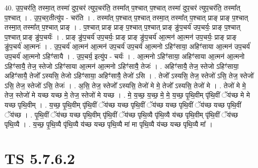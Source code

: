 \documentclass[17pt]{extarticle}
\begin{document}
40. उ॒प॒चर॑ति॒ तस्मा॒त् तस्मा॑ दुप॒चर॑ त्युप॒चर॑ति॒ तस्मा᳚त् प॒श्चात् प॒श्चात् तस्मा॑ दुप॒चर॑ त्युप॒चर॑ति॒ तस्मा᳚त् प॒श्चात् । . उ॒प॒चर॒तीत्यु॑प - चर॑ति । . तस्मा᳚त् प॒श्चात् प॒श्चात् तस्मा॒त् तस्मा᳚त् प॒श्चात् प्राङ् प्राङ् प॒श्चात् तस्मा॒त् तस्मा᳚त् प॒श्चात् प्राङ् । . प॒श्चात् प्राङ् प्राङ् प॒श्चात् प॒श्चात् प्राङ् ङु॑प॒चर्य॑ उप॒चर्यः॒ प्राङ् प॒श्चात् प॒श्चात् प्राङ् ङु॑प॒चर्यः॑ । . प्राङ् ङु॑प॒चर्य॑ उप॒चर्यः॒ प्राङ् प्राङ् ङु॑प॒चर्य॑ आ॒त्मन॑ आ॒त्मन॑ उप॒चर्यः॒ प्राङ् प्राङ्
ङु॑प॒चर्य॑ आ॒त्मनः॑ । . उ॒प॒चर्य॑ आ॒त्मन॑ आ॒त्मन॑ उप॒चर्य॑ उप॒चर्य॑ आ॒त्मनो ऽहिꣳ॑साया॒ अहिꣳ॑साया आ॒त्मन॑ उप॒चर्य॑ उप॒चर्य॑ आ॒त्मनो ऽहिꣳ॑सायै । . उ॒प॒चर्य॒ इत्यु॑प - चर्यः॑ । . आ॒त्मनो ऽहिꣳ॑साया॒ अहिꣳ॑साया आ॒त्मन॑ आ॒त्मनो ऽहिꣳ॑सायै॒ तेज॒ स्तेजो ऽहिꣳ॑साया आ॒त्मन॑ आ॒त्मनो ऽहिꣳ॑सायै॒ तेजः॑ । . अहिꣳ॑सायै॒ तेज॒ स्तेजो ऽहिꣳ॑साया॒ अहिꣳ॑सायै॒ तेजो᳚ ऽस्यसि॒ तेजो ऽहिꣳ॑साया॒ अहिꣳ॑सायै॒ तेजो॑ ऽसि । . तेजो᳚ ऽस्यसि॒ तेज॒ स्तेजो॑ ऽसि॒ तेज॒ स्तेजो॑ ऽसि॒ तेज॒ स्तेजो॑ ऽसि॒ तेजः॑ । . अ॒सि॒ तेज॒ स्तेजो᳚ ऽस्यसि॒ तेजो॑ मे मे॒ तेजो᳚ ऽस्यसि॒ तेजो॑ मे । . तेजो॑ मे मे॒ तेज॒ स्तेजो॑ मे यच्छ यच्छ मे॒ तेज॒ स्तेजो॑ मे यच्छ । . मे॒ य॒च्छ॒ य॒च्छ॒ मे॒ मे॒ य॒च्छ॒ पृ॒थि॒वीम् पृ॑थि॒वीं ॅय॑च्छ मे मे यच्छ पृथि॒वीम् । . य॒च्छ॒ पृ॒थि॒वीम् पृ॑थि॒वीं ॅय॑च्छ यच्छ पृथि॒वीं ॅय॑च्छ यच्छ पृथि॒वीं ॅय॑च्छ यच्छ पृथि॒वीं ॅय॑च्छ । . पृ॒थि॒वीं ॅय॑च्छ यच्छ पृथि॒वीम् पृ॑थि॒वीं ॅय॑च्छ पृथि॒व्यै पृ॑थि॒व्यै य॑च्छ पृथि॒वीम् पृ॑थि॒वीं ॅय॑च्छ पृथि॒व्यै । . य॒च्छ॒ पृ॒थि॒व्यै पृ॑थि॒व्यै य॑च्छ यच्छ पृथि॒व्यै मा॑ मा पृथि॒व्यै य॑च्छ यच्छ पृथि॒व्यै मा᳚ । \newline
\pagebreak
{}

\section{ TS 5.7.6.2 }
\end{document}
